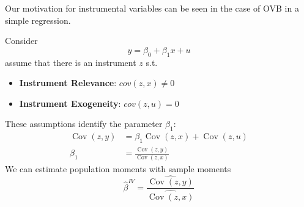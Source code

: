 \documentclass[11pt]{article}
\begin{document}
Our motivation for instrumental variables can be seen in the case of OVB in a simple regression.
\begin{definition}
    Consider
\[y = \beta_0 + \beta_1 x + u\]
assume that there is an instrument $z$ s.t.
\begin{itemize}
    \item \textbf{Instrument Relevance}: $cov(z,x) \neq0$
    \item \textbf{Instrument Exogeneity}: $cov(z,u)=0$
\end{itemize}
These assumptions identify the parameter $\beta_1$:
\begin{equation}
\begin{aligned}
\operatorname{Cov}(z, y) & =\beta_1 \operatorname{Cov}(z, x)+\operatorname{Cov}(z, u) \\
\beta_1 & =\frac{\operatorname{Cov}(z, y)}{\operatorname{Cov}(z, x)}
\end{aligned}
\end{equation}
We can estimate population moments with sample moments
\begin{equation}
\label{IV estimator}
\hat{\beta}^{IV} =\frac{\widehat{\operatorname{Cov}(z, y)}}{\widehat{\operatorname{Cov}(z, x)}}
\end{equation}
\end{definition}
\end{document}
